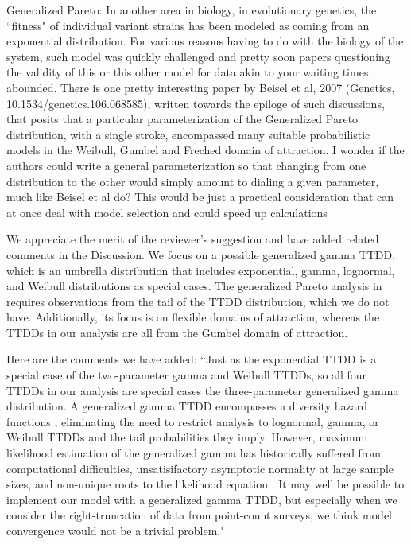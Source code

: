 \documentclass[12pt]{article}
\renewenvironment{quote}  %
              {\list{}{\rightmargin\leftmargin}\normalfont%
               \item\relax}
              {\endlist}
\begin{document}
Generalized Pareto: In another area in biology, in evolutionary genetics, the ``fitness" of individual variant strains has been modeled as coming from an exponential distribution.  For various reasons having to do with the biology of the system, such model was quickly challenged and pretty soon papers questioning the validity of this or this other model for data akin to your waiting times abounded. There is one pretty interesting paper by Beisel et al, 2007 (Genetics, 10.1534/genetics.106.068585), written towards the epiloge of such discussions, that posits that a particular parameterization of the Generalized Pareto distribution, with a single stroke, encompassed many suitable probabilistic models in the Weibull, Gumbel and Freched domain of attraction.  I wonder if the authors could write a general parameterization so that changing from one distribution to the other would simply amount to dialing a given parameter, much like Beisel et al do?  This would be just a practical
consideration that can at once deal with model selection and could speed up calculations
\begin{quote}
We appreciate the merit of the reviewer's suggestion and have added related comments in the Discussion.
We focus on a possible generalized gamma TTDD, which is an umbrella distribution that includes exponential, gamma, lognormal, and Weibull distributions as special cases.
The generalized Pareto analysis in \citet{Beisel2007} requires observations from the tail of the TTDD distribution, which we do not have.
Additionally, its focus is on flexible domains of attraction, whereas the TTDDs in our analysis are all from the Gumbel domain of attraction.

Here are the comments we have added:
``Just as the exponential TTDD is a special case of the two-parameter gamma and Weibull TTDDs, so all four TTDDs in our analysis are special cases the three-parameter generalized gamma distribution.
A generalized gamma TTDD encompasses a diversity hazard functions \citep{Cox2007}, eliminating the need to restrict analysis to lognormal, gamma, or Weibull TTDDs and the tail probabilities they imply.
However, maximum likelihood estimation of the generalized gamma has historically suffered from computational difficulties, unsatisifactory asymptotic normality at large sample sizes, and non-unique roots to the likelihood equation \citep{CoorayAnand2008, NoufailyJones2013}.
It may well be possible to implement our model with a generalized gamma TTDD, but especially when we consider the right-truncation of data from point-count surveys, we think model convergence would not be a trivial problem."
\end{quote}
\end{document}

